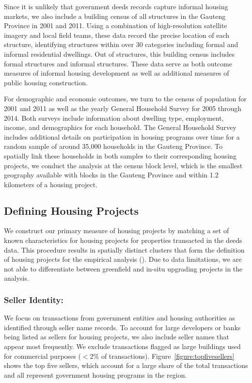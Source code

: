 \documentclass[12pt]{article}
\begin{document}
Since it is unlikely that government deeds records capture informal housing markets, we also include a building census of all structures in the Gauteng Province in 2001 and 2011.  Using a combination of high-resolution satellite imagery and local field teams, these data record the precise location of each structure, identifying structures within over 30 categories including formal and informal residential dwellings.  Out of structures, this building census includes formal structures and informal structures.  These data serve as both outcome measures of informal housing development as well as additional measures of public housing construction.

For demographic and economic outcomes, we turn to the census of population for 2001 and 2011 as well as the yearly General Household Survey for 2005 through 2014.  Both surveys include information about dwelling type, employment, income, and demographics for each household.  The General Household Survey includes additional details on participation in housing programs over time for a random sample of around 35,000 households in the Gauteng Province.  To spatially link these households in both samples to their corresponding housing projects, we conduct the analysis at the census block level, which is the smallest geography available with blocks in the Gauteng Province and within 1.2 kilometers of a housing project.  

\subsection{Defining Housing Projects}

We construct our primary measure of housing projects by matching a set of known characteristics for housing projects for properties transacted in the deeds data.  This procedure results in spatially distinct clusters that form the definition of housing projects for the empirical analysis (\cite{serihistory}).  Due to data limitations, we are not able to differentiate between greenfield and in-situ upgrading projects in the analysis.

\subsubsection{Seller Identity:}
We focus on transactions from government entities and housing authorities as identified through seller name records.  To account for large developers or banks being listed as sellers for housing projects, we also include seller names that appear most frequently.  We exclude transactions flagged as large buildings used for commercial purposes ($<$2\% of transactions).  Figure~\ref{figure:topfivesellers} shows the top five sellers, which account for a large share of the total transactions and all represent government housing programs in the region.  
\end{document}
